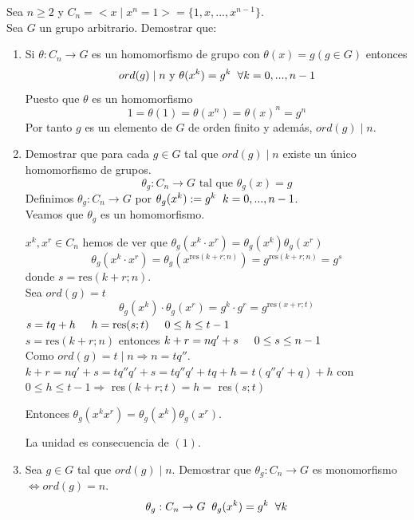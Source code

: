 \documentclass[11pt,a4paper]{article}
\begin{document}
Sea $n \geq 2$ y $C_{n} = <x \mid x^{n} = 1> = \{1, x, ..., x^{n-1}\}$. \\
Sea $G$ un grupo arbitrario. Demostrar que:
\begin{enumerate}[label = $(\arabic*)$]
\item Si $\theta: C_{n} \to G$ es un homomorfismo de grupo con $\theta(x) = g (g \in G)$ entonces
$$ord(g) \mid n \text{ y } \theta(x^{k}) = g^{k} \hspace{0.2cm} \forall k = 0, ..., n-1$$
Puesto que $\theta$ es un homomorfismo
$$1 = \theta(1) = \theta(x^{n}) = \theta(x)^{n} = g^{n}$$
Por tanto $g$ es un elemento de $G$ de orden finito y además, $ord(g) \mid n$.
\item Demostrar que para cada $g \in G$ tal que $ord(g) \mid n$ existe un único homomorfismo de grupos.
$$\theta_{g}: C_{n} \to G \text{ tal que } \theta_{g}(x) = g$$
Definimos $\theta_{g}: C_{n} \to G$ por $\theta_{g}(x^{k}) := g^{k} \hspace{0.2cm} k = 0, ..., n-1$. \\
Veamos que $\theta_{g}$ es un homomorfismo.

$x^{k}, x^{r} \in C_{n}$ hemos de ver que $\theta_{g}(x^{k} \cdot x^{r}) = \theta_{g}(x^{k}) \theta_{g}(x^{r})$
$$\theta_{g}(x^{k} \cdot x^{r}) = \theta_{g}(x^{\text{res}(k+r;n)}) = g^{\text{res}(k+r;n)} = g^{s}$$
donde $s = \text{res}(k+r;n)$. \\
Sea $ord(g) = t$
$$\theta_{g}(x^{k}) \cdot \theta_{g}(x^{r}) = g^{k} \cdot g^{r} = g^{\text{res}(x+r;t)}$$
$s = tq + h \hspace{0.5cm} h = \text{res}(s;t) \hspace{0.5cm} 0 \leq h \leq t - 1$ \\
$s = \text{res}(k+r;n)$ entonces $k+r=nq'+s \hspace{0.5cm} 0 \leq s \leq n-1$ \\
Como $ord(g) = t \mid n \Rightarrow n = tq''$. \\
$k+r = nq' + s = tq''q' + s = tq''q' + tq + h = t(q''q' +q)+h$ con $0 \leq h \leq t-1 \Rightarrow$ res$(k+r;t) = h = $ res$(s;t)$

Entonces $\theta_{g}(x^{k}x^{r}) = \theta_{g}(x^{k}) \theta_{g}(x^{r})$.

La unidad es consecuencia de $(1)$.

\item Sea $g \in G$ tal que $ord(g) \mid n$. Demostrar que $\theta_{g}: C_{n} \to G$ es monomorfismo $\iff ord(g) = n$.
$$\theta_{g}: C_{n} \to G \hspace{0.2cm} \theta_{g}(x^{k}) = g^{k} \hspace{0.2cm} \forall k$$
\end{enumerate}
\end{document}
